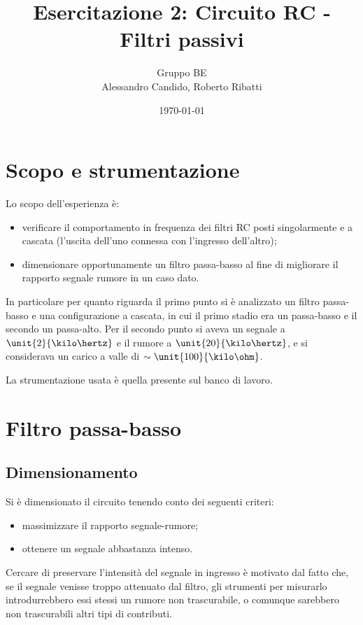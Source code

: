 \documentclass[10pt,a4paper]{article}
\title{Esercitazione 2: Circuito RC - Filtri passivi}
\author{Gruppo BE \\ Alessandro Candido, Roberto Ribatti}
\date{\today}
\begin{document}
\maketitle

\section{Scopo e strumentazione}
Lo scopo dell'esperienza è:
\begin{itemize}
\item verificare il comportamento in frequenza dei filtri RC posti singolarmente e a cascata (l'uscita dell'uno connessa con l'ingresso dell'altro);
\item dimensionare opportunamente un filtro passa-basso al fine di migliorare il rapporto segnale rumore in un caso dato.
\end{itemize}

In particolare per quanto riguarda il primo punto si è analizzato un filtro passa-basso e una configurazione a cascata, in cui il primo stadio era un passa-basso e il secondo un passa-alto. Per il secondo punto si aveva un segnale a $\unit{2}{\kilo\hertz}$ e il rumore a $\unit{20}{\kilo\hertz}$, e si considerava un carico a valle di $\sim \unit{100}{\kilo\ohm}$.

La strumentazione usata è quella presente sul banco di lavoro.

\section{Filtro passa-basso}

\subsection{Dimensionamento}
Si è dimensionato il circuito tenendo conto dei seguenti criteri:
\begin{itemize}
\item massimizzare il rapporto segnale-rumore;
\item ottenere un segnale abbastanza intenso.
\end{itemize}
Cercare di preservare l'intensità del segnale in ingresso è motivato dal fatto che, se il segnale venisse troppo attenuato dal filtro, gli strumenti per misurarlo introdurrebbero essi stessi un rumore non trascurabile, o comunque sarebbero non trascurabili altri tipi di contributi.
\end{document}
